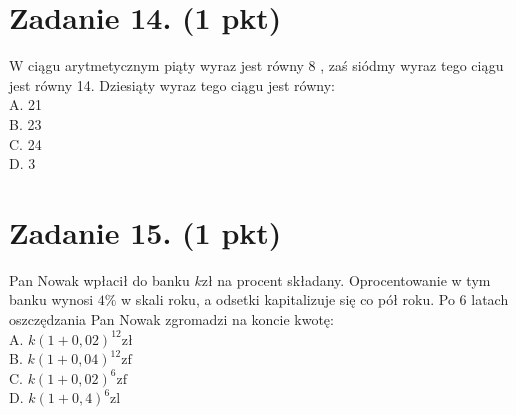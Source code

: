 \documentclass[10pt]{article}
\begin{document}
\section*{Zadanie 14. (1 pkt)}
W ciągu arytmetycznym piąty wyraz jest równy 8 , zaś siódmy wyraz tego ciągu jest równy 14. Dziesiąty wyraz tego ciągu jest równy:\\
A. 21\\
B. 23\\
C. 24\\
D. 3

\section*{Zadanie 15. (1 pkt)}
Pan Nowak wpłacił do banku \(k \mathrm{zł}\) na procent składany. Oprocentowanie w tym banku wynosi \(4 \%\) w skali roku, a odsetki kapitalizuje się co pół roku. Po 6 latach oszczędzania Pan Nowak zgromadzi na koncie kwotę:\\
A. \(k(1+0,02)^{12} \mathrm{zł}\)\\
B. \(k(1+0,04)^{12} \mathrm{zf}\)\\
C. \(k(1+0,02)^{6} \mathrm{zf}\)\\
D. \(k(1+0,4)^{6} \mathrm{zl}\)
\end{document}
